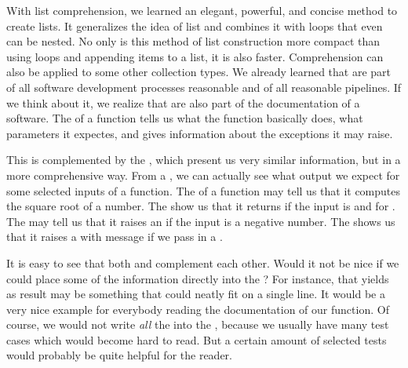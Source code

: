With list comprehension, we learned an elegant, powerful, and concise method to create lists.
It generalizes the idea of list  and combines it with  loops that even can be nested.
No only is this method of list construction more compact than using loops and appending items to a list, it is also faster.
Comprehension can also be applied to some other collection types.%
\FloatBarrier%
\endhsection%
%
%
\FloatBarrier%
%
%
%
%
%
%
We already learned that  are part of all software development processes reasonable and of all reasonable  pipelines.
If we think about it, we realize that  are also part of the documentation of a software.
The  of a function tells us what the function basically does, what parameters it expectes, and gives information about the exceptions it may raise.

This is complemented by the , which present us very similar information, but in a more comprehensive way.
From a , we can actually see what output we expect for some selected inputs of a function.
The  of a  function may tell us that it computes the square root of a number.
The  show us that it returns  if the input is  and  for .
The  may tell us that it raises an  if the input is a negative number.
The  shows us that it raises a  with message \emph{} if we pass in a .

It is easy to see that both  and  complement each other.
Would it not be nice if we could place some of the  information directly into the ?
For instance, that  yields  as result may be something that could neatly fit on a single line.
It would be a very nice example for everybody reading the documentation of our function.
Of course, we would not write \emph{all} the  into the , because we usually have many test cases which would become hard to read.
But a certain amount of selected tests would probably be quite helpful for the reader.

